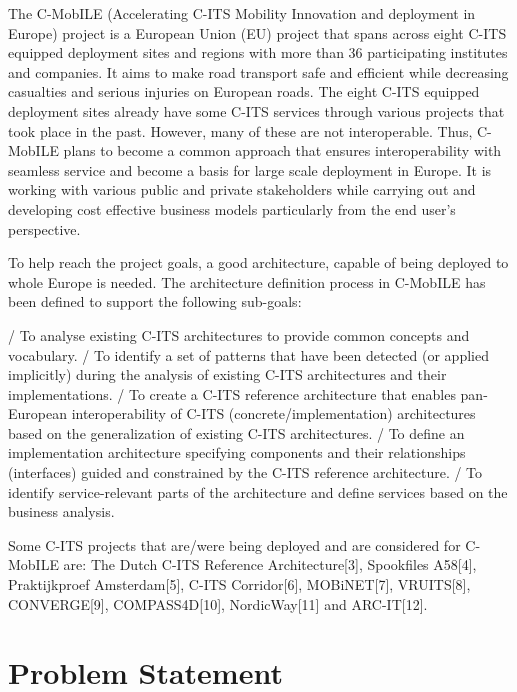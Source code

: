 \documentclass[conference]{IEEEtran}
\begin{document}
The C-MobILE (Accelerating C-ITS Mobility Innovation and deployment in Europe) project is a European Union (EU) project that spans across eight C-ITS equipped deployment sites and regions with more than 36 participating institutes and companies. It aims to make road transport safe and efficient while decreasing casualties and serious injuries on European roads.
The eight C-ITS equipped deployment sites already have some C-ITS services through various projects that took place in the past. However, many of these are not interoperable. Thus, C-MobILE plans to become a common approach that ensures interoperability with seamless service and become a basis for large scale deployment in Europe. It is working with various public and private stakeholders while carrying out and developing cost effective business models particularly from the end user’s perspective.

To help reach the project goals, a good architecture, capable of being deployed to whole Europe is needed. The architecture definition process in C-MobILE has been defined to support the following sub-goals:

/ To analyse existing C-ITS architectures to provide common concepts and vocabulary.
/ To identify a set of patterns that have been detected (or applied implicitly) during the analysis of existing C-ITS architectures and their implementations.
/ To create a C-ITS reference architecture that enables pan-European interoperability of C-ITS (concrete/implementation) architectures based on the generalization of existing C-ITS architectures.
/ To define an implementation architecture specifying components and their relationships (interfaces) guided and constrained by the C-ITS reference architecture.
/ To identify service-relevant parts of the architecture and define services based on the business analysis.
 
Some C-ITS projects that are/were being deployed and are considered for C-MobILE are: The Dutch C-ITS Reference Architecture[3], Spookfiles A58[4], Praktijkproef Amsterdam[5], C-ITS Corridor[6], MOBiNET[7], VRUITS[8], CONVERGE[9], COMPASS4D[10], NordicWay[11] and ARC-IT[12].

\section{Problem Statement}
\end{document}
